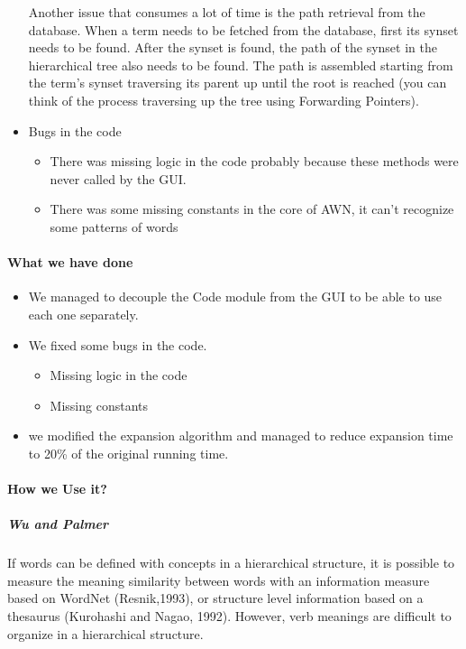 \begin{itemize}
Another issue that consumes a lot of time is the path retrieval from the database. When a term needs to be fetched from the database, first its synset needs to be found. After the synset is found, the path of the synset in the hierarchical tree also needs to be found. The path is assembled starting from the term’s synset traversing its parent up until the root is reached (you can think of the process traversing up the tree using Forwarding Pointers). \\
\item Bugs in the code\\
\begin{itemize}
\item There was missing logic in the code probably because these methods were never called by the GUI.
\item There was some missing constants in the core of AWN, it can't recognize some patterns of words
\end{itemize}
\end{itemize}
  
\paragraph{What we have done}
\begin{itemize}
\item We managed to decouple the Code module from the GUI to be able to use each one separately.
\item We fixed some bugs in the code.
\begin{itemize}
\item Missing logic in the code
\item Missing constants
\end{itemize}
\item we modified the expansion algorithm and managed to reduce expansion time to 20\% of the original running time.
\end{itemize}

\paragraph{How we Use it?}
\subparagraph{Wu and Palmer}
If words can be defined with concepts in a hierarchical structure, it is possible to measure the meaning similarity between words with an information measure based on WordNet (Resnik,1993), or structure level information based on a thesaurus (Kurohashi and Nagao, 1992). However, verb meanings are difficult to organize in a hierarchical structure.\\

